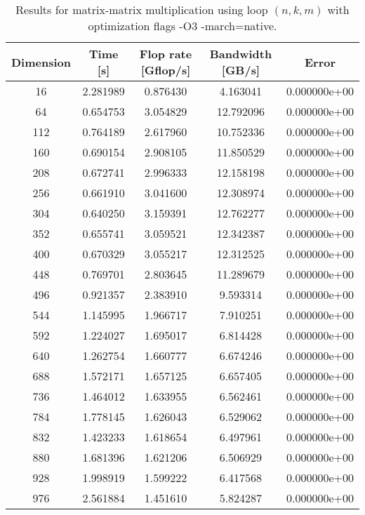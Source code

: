 \documentclass[10pt,a4paper]{article}
\theoremstyle{dotlessP}
\begin{document}
	\begin{table}[tbhp] 
	{\footnotesize
		\caption{Results for matrix-matrix multiplication using loop $(n,k,m)$ with optimization flags -O3 -march=native.
		}\label{tab:nkm}
		\begin{center}
			\begin{tabular}{ccccc}
				\hline 
				Dimension &    Time [s] &  Flop rate [Gflop/s]     & Bandwidth  [GB/s] & Error\\ 
				\hline 
        16  &   2.281989  &   0.876430 &   4.163041 &  0.000000e+00\\ 
64  &   0.654753  &   3.054829 &  12.792096 &  0.000000e+00\\ 
112  &   0.764189  &   2.617960 &  10.752336 &  0.000000e+00\\ 
160  &   0.690154  &   2.908105 &  11.850529 &  0.000000e+00\\ 
208  &   0.672741  &   2.996333 &  12.158198 &  0.000000e+00\\ 
256  &   0.661910  &   3.041600 &  12.308974 &  0.000000e+00\\ 
304  &   0.640250  &   3.159391 &  12.762277 &  0.000000e+00\\ 
352  &   0.655741  &   3.059521 &  12.342387 &  0.000000e+00\\ 
400  &   0.670329  &   3.055217 &  12.312525 &  0.000000e+00\\ 
448  &   0.769701  &   2.803645 &  11.289679 &  0.000000e+00\\ 
496  &   0.921357  &   2.383910 &   9.593314 &  0.000000e+00\\ 
544  &   1.145995  &   1.966717 &   7.910251 &  0.000000e+00\\ 
592  &   1.224027  &   1.695017 &   6.814428 &  0.000000e+00\\ 
640  &   1.262754  &   1.660777 &   6.674246 &  0.000000e+00\\ 
688  &   1.572171  &   1.657125 &   6.657405 &  0.000000e+00\\ 
736  &   1.464012  &   1.633955 &   6.562461 &  0.000000e+00\\ 
784  &   1.778145  &   1.626043 &   6.529062 &  0.000000e+00\\ 
832  &   1.423233  &   1.618654 &   6.497961 &  0.000000e+00\\ 
880  &   1.681396  &   1.621206 &   6.506929 &  0.000000e+00\\ 
928  &   1.998919  &   1.599222 &   6.417568 &  0.000000e+00\\ 
976  &   2.561884  &   1.451610 &   5.824287 &  0.000000e+00\\ 

\end{tabular}
\end{center}}
\end{table}
\end{document}
